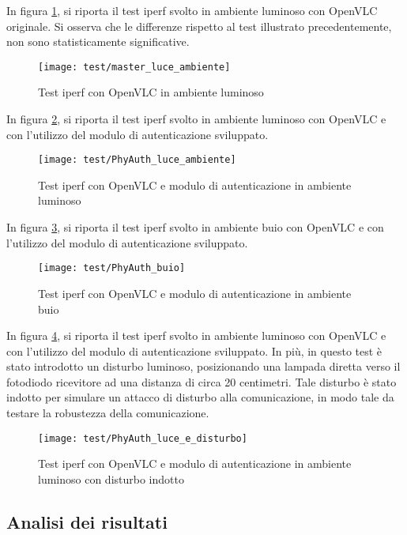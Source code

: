 \noindent In figura \ref{fig:iperf_openvlc_luce_ambiente}, si riporta il test iperf svolto in ambiente luminoso con OpenVLC originale. Si osserva che le differenze rispetto al test illustrato precedentemente, non sono statisticamente significative.
\begin{figure}[H] 
    \centering 
    \texttt{[image: test/master\_luce\_ambiente]} 
    \caption{Test iperf con OpenVLC in ambiente luminoso}
    \label{fig:iperf_openvlc_luce_ambiente}
\end{figure}

\noindent In figura \ref{fig:iperf_openvlc_auth_luce_ambiente}, si riporta il test iperf svolto in ambiente luminoso con OpenVLC e con l'utilizzo del modulo di autenticazione sviluppato.
\begin{figure}[H] 
    \centering 
    \texttt{[image: test/PhyAuth\_luce\_ambiente]} 
    \caption{Test iperf con OpenVLC e modulo di autenticazione in ambiente luminoso}
    \label{fig:iperf_openvlc_auth_luce_ambiente}
\end{figure}

\noindent In figura \ref{fig:iperf_openvlc_auth_buio}, si riporta il test iperf svolto in ambiente buio con OpenVLC e con l'utilizzo del modulo di autenticazione sviluppato.
\begin{figure}[H] 
    \centering 
    \texttt{[image: test/PhyAuth\_buio]} 
    \caption{Test iperf con OpenVLC e modulo di autenticazione in ambiente buio}
    \label{fig:iperf_openvlc_auth_buio}
\end{figure}

\noindent In figura \ref{fig:iperf_openvlc_auth_luce_disturbo}, si riporta il test iperf svolto in ambiente luminoso con OpenVLC e con l'utilizzo del modulo di autenticazione sviluppato. In più, in questo test è stato introdotto un disturbo luminoso, posizionando una lampada diretta verso il fotodiodo ricevitore ad una distanza di circa 20 centimetri. Tale disturbo è stato indotto per simulare un attacco di disturbo alla comunicazione, in modo tale da testare la robustezza della comunicazione.
\begin{figure}[H] 
    \centering 
    \texttt{[image: test/PhyAuth\_luce\_e\_disturbo]} 
    \caption{Test iperf con OpenVLC e modulo di autenticazione in ambiente luminoso con disturbo indotto}
    \label{fig:iperf_openvlc_auth_luce_disturbo}
\end{figure}

\subsection{Analisi dei risultati}

